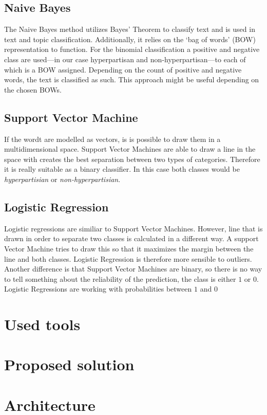 \documentclass{article}
\begin{document}
\subsection{Naive Bayes}
The Naive Bayes method utilizes Bayes' Theorem to classify text and is used in text and topic classification.
Additionally, it relies on the `bag of words' (BOW) representation to function.
For the binomial classification a positive and negative class are used---in our case hyperpartisan and non-hyperpartisan---to each of which is a BOW assigned.
Depending on the count of positive and negative words, the text is classified as such.
This approach might be useful depending on the chosen BOWs.

\subsection{Support Vector Machine}
If the wordt are modelled as vectors, is is possible to draw them in a multidimensional space. Support Vector Machines are able to draw a line in the space with creates the best separation between two types of categories. Therefore it is really suitable as a binary classifier. In this case both classes would be \textit{hyperpartisian} or \textit{non-hyperpartisian}.

\subsection{Logistic Regression}
Logistic regressions are similiar to Support Vector Machines. However, line that is drawn in order to separate two classes is calculated in a different way. A support Vector Machine tries to draw this so that it maximizes the margin between the line and both classes. Logistic Regression is therefore more sensible to outliers. Another difference is that Support Vector Machines are binary, so there is no way to tell something about the reliability of the prediction, the class is either $1$ or $0$. Logistic Regressions are working with probabilities between $1$ and $0$

\section{Used tools}

\section{Proposed solution}

\section{Architecture}
\end{document}
